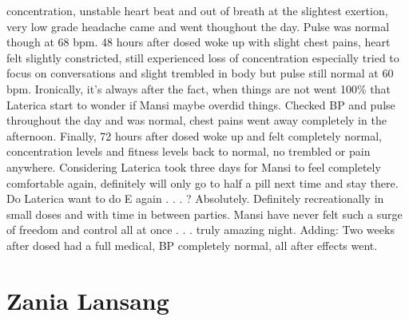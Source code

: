 \documentclass[12pt]{book}
\begin{document}
concentration, unstable heart beat and out of breath at the slightest exertion, very low grade headache came and went thoughout the day. Pulse was normal though at 68 bpm. 48 hours after dosed woke up with slight chest pains, heart felt slightly constricted, still experienced loss of concentration especially tried to focus on conversations and slight trembled in body but pulse still normal at 60 bpm. Ironically, it's always after the fact, when things are not went 100\% that Laterica start to wonder if Mansi maybe overdid things. Checked BP and pulse throughout the day and was normal, chest pains went away completely in the afternoon. Finally, 72 hours after dosed woke up and felt completely normal, concentration levels and fitness levels back to normal, no trembled or pain anywhere. Considering Laterica took three days for Mansi to feel completely comfortable again, definitely will only go to half a pill next time and stay there. Do Laterica want to do E again . . . ? Absolutely. Definitely recreationally in small doses and with time in between parties. Mansi have never felt such a surge of freedom and control all at once . . . truly amazing night. Adding: Two weeks after dosed had a full medical, BP completely normal, all after effects went.



\chapter{Zania Lansang}
\end{document}
